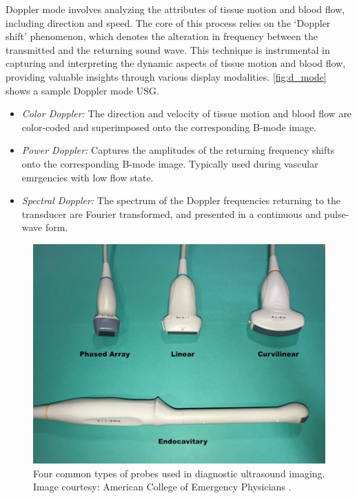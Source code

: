 %
Doppler mode involves analyzing the attributes of tissue motion and blood flow, including direction and speed. The core of this process relies on the `Doppler shift' phenomenon, which denotes the alteration in frequency between the transmitted and the returning sound wave. This technique is instrumental in capturing and interpreting the dynamic aspects of tissue motion and blood flow, providing valuable insights through various display modalities. \cref{fig:d_mode} shows a sample Doppler mode USG.
\begin{itemize}
    \item \emph{Color Doppler:} The direction and velocity of tissue motion and blood flow are color-coded and superimposed onto the corresponding B-mode image. 
    \item \emph{Power Doppler:} Captures the amplitudes of the returning frequency shifts onto the corresponding B-mode image. Typically used during vascular emrgencies with low flow state.
    \item \emph{Spectral Doppler:}  The spectrum of the Doppler frequencies returning to the transducer are Fourier transformed, and presented in a continuous and pulse-wave form.
\end{itemize}

\begin{figure}[!t]
    \centering
    \includegraphics[width=0.5\linewidth]{figs/usg_probes.png}
    \caption[Common USG probes]{Four common types of probes used in diagnostic ultrasound imaging. Image courtesy: American College of Emergency Physicians \cite{acep}.}
    \label{fig:usg_probes}
\end{figure}

